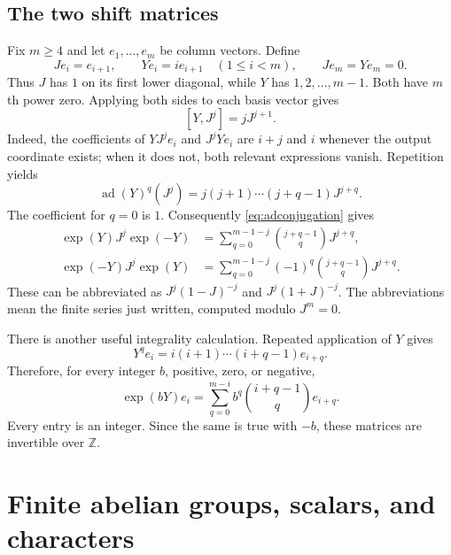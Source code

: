 \documentclass[11pt]{article}
\numberwithin{equation}{section}
\theoremstyle{definition}
\theoremstyle{remark}
\newcommand{\Z}{\mathbb Z}
\newcommand{\ad}{\operatorname{ad}}
\begin{document}
\subsection{The two shift matrices}
Fix $m\ge4$ and let $e_1,\ldots,e_m$ be column vectors. Define
\begin{equation}\label{eq:JY}
Je_i=e_{i+1},\qquad Ye_i=i e_{i+1}\quad(1\le i<m),\qquad Je_m=Ye_m=0.
\end{equation}
Thus $J$ has $1$ on its first lower diagonal, while $Y$ has $1,2,\ldots,m-1$. Both have $m$th power zero. Applying both sides to each basis vector gives
\begin{equation}\label{eq:adshift}
[Y,J^j]=jJ^{j+1}.
\end{equation}
Indeed, the coefficients of $YJ^je_i$ and $J^jYe_i$ are $i+j$ and $i$ whenever the output coordinate exists; when it does not, both relevant expressions vanish. Repetition yields
\[
\ad(Y)^q(J^j)=j(j+1)\cdots(j+q-1)J^{j+q}.
\]
The coefficient for $q=0$ is $1$. Consequently \eqref{eq:adconjugation} gives
\begin{align}
\exp(Y)J^j\exp(-Y)
&=\sum_{q=0}^{m-1-j}\binom{j+q-1}{q}J^{j+q},\label{eq:Tseries}\\
\exp(-Y)J^j\exp(Y)
&=\sum_{q=0}^{m-1-j}(-1)^q\binom{j+q-1}{q}J^{j+q}.\label{eq:Tinvseries}
\end{align}
These can be abbreviated as $J^j(1-J)^{-j}$ and $J^j(1+J)^{-j}$. The abbreviations mean the finite series just written, computed modulo $J^m=0$.

There is another useful integrality calculation. Repeated application of $Y$ gives
\[
Y^q e_i=i(i+1)\cdots(i+q-1)e_{i+q}.
\]
Therefore, for every integer $b$, positive, zero, or negative,
\begin{equation}\label{eq:Yinteger}
\exp(bY)e_i=\sum_{q=0}^{m-i}b^q\binom{i+q-1}{q}e_{i+q}.
\end{equation}
Every entry is an integer. Since the same is true with $-b$, these matrices are invertible over $\Z$.

\section{Finite abelian groups, scalars, and characters}\label{sec:characters}
\end{document}
